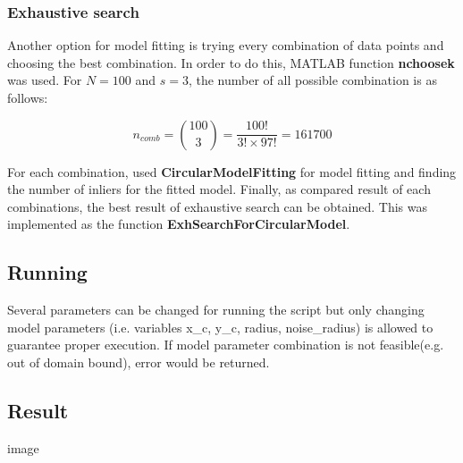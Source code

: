 \documentclass[paper=a4, fontsize=11pt]{scrartcl} %
\numberwithin{equation}{section} %
\numberwithin{figure}{section} %
\numberwithin{table}{section} %
\newcommand{\funcname}[1]{\textbf{#1}}
\begin{document}
\subsubsection{Exhaustive search}

Another option for model fitting is trying every combination of data points and choosing the best combination. In order to do this, MATLAB function \funcname{nchoosek} was used. For $N = 100$ and $s = 3$, the number of all possible combination is as follows:

\begin{equation*}
n_{comb} = \binom{100}{3}=\frac{100!}{3! \times 97!}=161700
\end{equation*}

For each combination, used \funcname{CircularModelFitting} for model fitting and finding the number of inliers for the fitted model. Finally, as compared result of each combinations, the best result of exhaustive search can be obtained. This was implemented as the function \funcname{ExhSearchForCircularModel}.

\subsection{Running}

Several parameters can be changed for running the script but only changing model parameters (i.e. variables x\_c, y\_c, radius, noise\_radius) is allowed to guarantee proper execution. If model parameter combination is not feasible(e.g. out of domain bound), error would be returned. \\

\subsection{Result}

image


\end{document}
